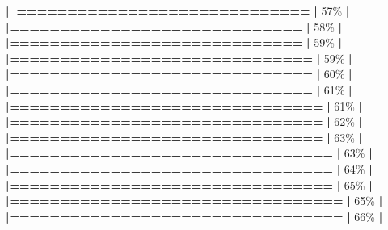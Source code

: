 \documentclass[
]{book}
\newenvironment{Shaded}{\begin{snugshade}}{\end{snugshade}}
\newcommand{\DecValTok}[1]{\textcolor[rgb]{0.00,0.00,0.81}{#1}}
\newcommand{\ErrorTok}[1]{\textcolor[rgb]{0.64,0.00,0.00}{\textbf{#1}}}
\newcommand{\NormalTok}[1]{#1}
\newcommand{\SpecialCharTok}[1]{\textcolor[rgb]{0.81,0.36,0.00}{\textbf{#1}}}
\begin{document}
\begin{Shaded}
\begin{Highlighting}[]
  \SpecialCharTok{|}                                                        
  \ErrorTok{|=============================}                     \ErrorTok{|}  \DecValTok{57}\NormalTok{\%}
  \SpecialCharTok{|}                                                        
  \ErrorTok{|=============================}                     \ErrorTok{|}  \DecValTok{58}\NormalTok{\%}
  \SpecialCharTok{|}                                                        
  \ErrorTok{|=============================}                     \ErrorTok{|}  \DecValTok{59}\NormalTok{\%}
  \SpecialCharTok{|}                                                        
  \ErrorTok{|==============================}                    \ErrorTok{|}  \DecValTok{59}\NormalTok{\%}
  \SpecialCharTok{|}                                                        
  \ErrorTok{|==============================}                    \ErrorTok{|}  \DecValTok{60}\NormalTok{\%}
  \SpecialCharTok{|}                                                        
  \ErrorTok{|==============================}                    \ErrorTok{|}  \DecValTok{61}\NormalTok{\%}
  \SpecialCharTok{|}                                                        
  \ErrorTok{|===============================}                   \ErrorTok{|}  \DecValTok{61}\NormalTok{\%}
  \SpecialCharTok{|}                                                        
  \ErrorTok{|===============================}                   \ErrorTok{|}  \DecValTok{62}\NormalTok{\%}
  \SpecialCharTok{|}                                                        
  \ErrorTok{|===============================}                   \ErrorTok{|}  \DecValTok{63}\NormalTok{\%}
  \SpecialCharTok{|}                                                        
  \ErrorTok{|================================}                  \ErrorTok{|}  \DecValTok{63}\NormalTok{\%}
  \SpecialCharTok{|}                                                        
  \ErrorTok{|================================}                  \ErrorTok{|}  \DecValTok{64}\NormalTok{\%}
  \SpecialCharTok{|}                                                        
  \ErrorTok{|================================}                  \ErrorTok{|}  \DecValTok{65}\NormalTok{\%}
  \SpecialCharTok{|}                                                        
  \ErrorTok{|=================================}                 \ErrorTok{|}  \DecValTok{65}\NormalTok{\%}
  \SpecialCharTok{|}                                                        
  \ErrorTok{|=================================}                 \ErrorTok{|}  \DecValTok{66}\NormalTok{\%}
  \SpecialCharTok{|}                                                        

\end{Highlighting}
\end{Shaded}
\end{document}
